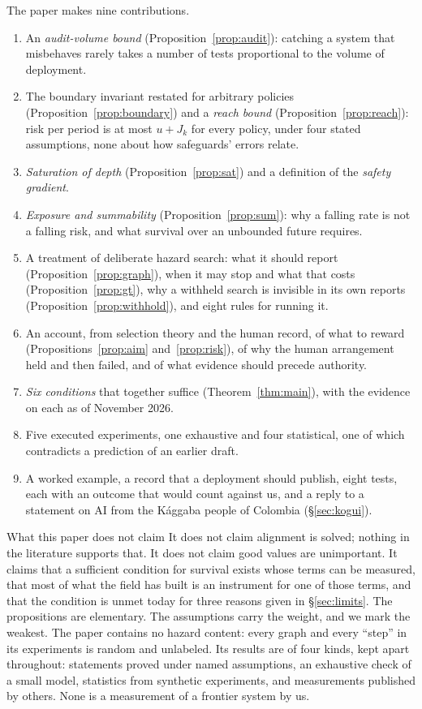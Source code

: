 \documentclass[10pt,twocolumn]{article}
\theoremstyle{plain}
\theoremstyle{definition}
\begin{document}
The paper makes nine contributions.
\begin{enumerate}
\item An \emph{audit-volume bound} (Proposition~\ref{prop:audit}): catching a system that
misbehaves rarely takes a number of tests proportional to the volume of deployment.
\item The boundary invariant restated for arbitrary policies (Proposition~\ref{prop:boundary})
and a \emph{reach bound} (Proposition~\ref{prop:reach}): risk per period is at most
$u+J_{k}$ for every policy, under four stated assumptions, none about how safeguards' errors
relate.
\item \emph{Saturation of depth} (Proposition~\ref{prop:sat}) and a definition of the
\emph{safety gradient}.
\item \emph{Exposure and summability} (Proposition~\ref{prop:sum}): why a falling rate is not
a falling risk, and what survival over an unbounded future requires.
\item A treatment of deliberate hazard search: what it should report
(Proposition~\ref{prop:graph}), when it may stop and what that costs
(Proposition~\ref{prop:gt}), why a withheld search is invisible in its own reports
(Proposition~\ref{prop:withhold}), and eight rules for running it.
\item An account, from selection theory and the human record, of what to reward
(Propositions~\ref{prop:aim} and~\ref{prop:risk}), of why the human arrangement held and then failed, and of what
evidence should precede authority.
\item \emph{Six conditions} that together suffice (Theorem~\ref{thm:main}), with the evidence
on each as of November 2026.
\item Five executed experiments, one exhaustive and four statistical, one of which
contradicts a prediction of an earlier draft.
\item A worked example, a record that a deployment should publish, eight tests, each with
an outcome that would count against us, and a reply to a statement on AI from the K\'aggaba
people of Colombia (\S\ref{sec:kogui}).
\end{enumerate}

\begin{claimbox}{What this paper does not claim}
\small
It does not claim alignment is solved; nothing in the literature supports that. It does not
claim good values are unimportant. It claims that a sufficient condition for survival exists
whose terms can be measured, that most of what the field has built is an instrument for one
of those terms, and that the condition is unmet today for three reasons given in
\S\ref{sec:limits}. The propositions are elementary. The assumptions carry the weight, and we
mark the weakest. The paper contains no hazard content: every graph and every ``step'' in
its experiments is random and unlabeled. Its results are of four kinds, kept apart throughout:
statements proved under named assumptions, an exhaustive check of a small model, statistics
from synthetic experiments, and measurements published by others. None is a measurement of a
frontier system by us.
\end{claimbox}
\end{document}
